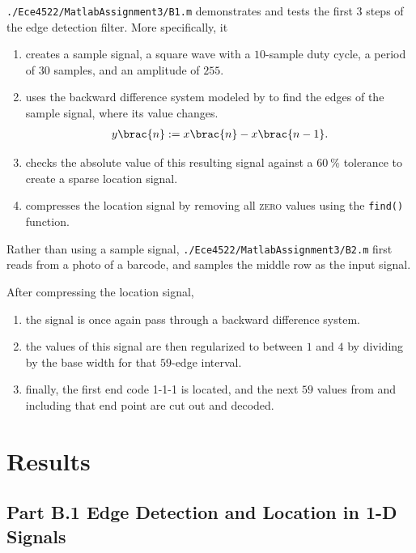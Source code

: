 \documentclass[conference]{../lib/IEEEtran}
\DeclarePairedDelimiter\brac[]%
\newcommand*\tbrao[1]{(#1)}
\begin{document}
\texttt{./Ece4522/MatlabAssignment3/B1.m} demonstrates and tests the first \(3\) steps of the edge detection filter. More specifically, it
\begin{enumerate}
    \item
        creates a sample signal, a square wave with a \(10\)-sample duty cycle, a period of \(30\) samples, and an amplitude of \(255\).
    \item
        uses the backward difference system modeled by \tbrao{\ref{eqn:bdn}} to find the edges of the sample signal, where its value changes.
        \begin{eqnarray}\label{eqn:bdn}
            y\brac{n} := x\brac{n} - x\brac{n - 1}.
        \end{eqnarray}
    \item
        checks the absolute value of this resulting signal against a \(\SI{60}\percent\) tolerance to create a sparse location signal.
    \item
        compresses the location signal by removing all \textsc{zero} values using the \texttt{find()} function.
\end{enumerate}

Rather than using a sample signal, \texttt{./Ece4522/MatlabAssignment3/B2.m} first reads from a photo of a barcode, and samples the middle row as the input signal.

After compressing the location signal,
\begin{enumerate}
    \item
        the signal is once again pass through a backward difference system.
    \item
        the values of this signal are then regularized to between \(1\) and \(4\) by dividing by the base width for that \(59\)-edge interval.
    \item
        finally, the first end code 1-1-1 is located, and the next \(59\) values from and including that end point are cut out and decoded.
\end{enumerate}

\section{Results}

\subsection{Part B.1 Edge Detection and Location in 1-D Signals}
\end{document}
